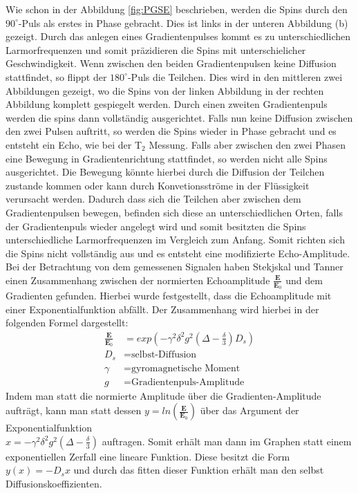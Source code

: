Wie schon in der Abbildung \ref{fig:PGSE} beschrieben, werden die Spins durch den $90^{\circ}$-Puls als erstes in Phase gebracht. Dies ist links in der unteren Abbildung (b) gezeigt. Durch das anlegen eines Gradientenpulses kommt es zu unterschiedlichen Larmorfrequenzen und somit präzidieren die Spins mit unterschielicher Geschwindigkeit.
Wenn zwischen den beiden Gradientenpulsen keine Diffusion stattfindet, so flippt der $180^{\circ}$-Puls die Teilchen. Dies wird in den mittleren zwei Abbildungen gezeigt, wo die Spins von der linken Abbildung in der rechten Abbildung komplett gespiegelt werden. Durch einen zweiten Gradientenpuls werden die spins dann vollständig ausgerichtet. Falls nun keine Diffusion zwischen den zwei Pulsen auftritt, so werden die Spins wieder in Phase gebracht und es entsteht ein Echo,
 wie bei der T$_2$ Messung.
Falls aber zwischen den zwei Phasen eine Bewegung in Gradientenrichtung stattfindet,
so werden nicht alle Spins ausgerichtet. 
Die Bewegung könnte hierbei durch die Diffusion der Teilchen zustande kommen oder kann durch Konvetionsströme in der Flüssigkeit verursacht werden.
Dadurch dass sich die Teilchen aber zwischen dem Gradientenpulsen bewegen, befinden sich diese an unterschiedlichen Orten, falls der Gradientenpuls wieder angelegt wird und somit besitzten die Spins unterschiedliche Larmorfrequenzen im Vergleich zum Anfang.
Somit richten sich die Spins nicht vollständig aus und es entsteht eine modifizierte Echo-Amplitude.
Bei der Betrachtung von dem gemessenen Signalen haben Stekjskal und Tanner einen Zusammenhang zwischen der normierten Echoamplitude $\frac{\textbf{E}}{\textbf{E}_0}$ und dem Gradienten gefunden. Hierbei wurde festgestellt, dass die Echoamplitude mit einer Exponentialfunktion abfällt. Der Zusammenhang wird hierbei in der folgenden Formel dargestellt:
\begin{align}
    \frac{\textbf{E}}{\textbf{E}_0}&=exp\left(-\gamma^2\delta^2g^2\left(\Delta-\frac{\delta}{3}\right)D_s\right)\\
    D_s&=\text{selbst-Diffusion}\\
    \gamma&= \text{gyromagnetische Moment}\\
    g &= \text{Gradientenpuls-Amplitude}
\end{align}
Indem man statt die normierte Amplitude über die Gradienten-Amplitude aufträgt, kann man statt dessen $y=ln\left(\frac{\textbf{E}}{\textbf{E}_0}\right)$ über  das Argument der Exponentialfunktion\\
 $x= -\gamma^2\delta^2g^2\left(\Delta-\frac{\delta}{3}\right)$ auftragen. Somit erhält man dann im Graphen statt einem exponentiellen Zerfall eine lineare Funktion. Diese besitzt die Form $y(x)=-D_sx$ und durch das fitten dieser Funktion erhält man den selbst Diffusionskoeffizienten.       

